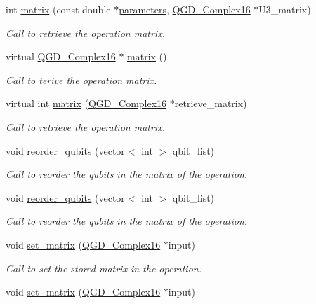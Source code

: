 \begin{DoxyCompactItemize}
int \hyperlink{class_u3_afd2e3973d7199252fe139fb214087ea4}{matrix} (const double $\ast$\hyperlink{class_u3_a6b07be37e63be67b306393a90d759f70}{parameters}, \hyperlink{struct_q_g_d___complex16}{Q\+G\+D\+\_\+\+Complex16} $\ast$U3\+\_\+matrix)
\begin{DoxyCompactList}\small\item\em Call to retrieve the operation matrix. \end{DoxyCompactList}\item 
virtual \hyperlink{struct_q_g_d___complex16}{Q\+G\+D\+\_\+\+Complex16} $\ast$ \hyperlink{class_operation_acf7d1765143285ff73772ae860109988}{matrix} ()
\begin{DoxyCompactList}\small\item\em Call to terive the operation matrix. \end{DoxyCompactList}\item 
virtual int \hyperlink{class_operation_add11c6ea2626d8dbcbd00f328a8a8279}{matrix} (\hyperlink{struct_q_g_d___complex16}{Q\+G\+D\+\_\+\+Complex16} $\ast$retrieve\+\_\+matrix)
\begin{DoxyCompactList}\small\item\em Call to retrieve the operation matrix. \end{DoxyCompactList}\item 
void \hyperlink{class_u3_a700efa043c863f32465861d338efdd2b}{reorder\+\_\+qubits} (vector$<$ int $>$ qbit\+\_\+list)
\begin{DoxyCompactList}\small\item\em Call to reorder the qubits in the matrix of the operation. \end{DoxyCompactList}\item 
void \hyperlink{class_u3_a700efa043c863f32465861d338efdd2b}{reorder\+\_\+qubits} (vector$<$ int $>$ qbit\+\_\+list)
\begin{DoxyCompactList}\small\item\em Call to reorder the qubits in the matrix of the operation. \end{DoxyCompactList}\item 
void \hyperlink{class_operation_a026d3dcf0ad00af99c7a9097d3cf1c74}{set\+\_\+matrix} (\hyperlink{struct_q_g_d___complex16}{Q\+G\+D\+\_\+\+Complex16} $\ast$input)
\begin{DoxyCompactList}\small\item\em Call to set the stored matrix in the operation. \end{DoxyCompactList}\item 
void \hyperlink{class_operation_a026d3dcf0ad00af99c7a9097d3cf1c74}{set\+\_\+matrix} (\hyperlink{struct_q_g_d___complex16}{Q\+G\+D\+\_\+\+Complex16} $\ast$input)

\end{DoxyCompactItemize}
